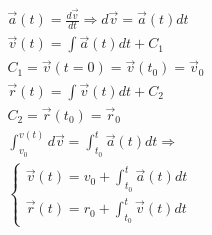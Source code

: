 \documentclass{article}
\begin{document}
\begin{gather*}
	\vec{a}(t) = \frac{d \vec{v}}{dt} \Rightarrow d \vec{v} = \vec{a}(t) dt \\
	\vec{v}(t) = \int \vec{a}(t) dt + C_1 \\
	C_1 = \vec{v}(t = 0) = \vec{v}(t_0) = \vec{v}_0 \\
	\vec{r}(t) = \int \vec{v}(t)dt + C_2 \\
	C_2 = \vec{r}(t_0) = \vec{r}_0 \\
	\int_{v_0}^{v(t)} d\vec{v} = \int_{t_0}^{t} \vec{a}(t) dt \Rightarrow \\
	\begin{cases}
		\vec{v}(t) = v_0 + \int_{t_0}^{t} \vec{a}(t) dt \\
		\vec{r}(t) = r_0 + \int_{t_0}^{t} \vec{v}(t) dt
	\end{cases}
\end{gather*}
\end{document}
